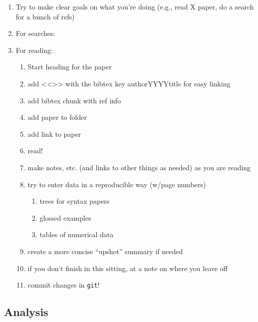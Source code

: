 \documentclass[11pt]{article}
\begin{document}
\begin{enumerate}
\item Try to make clear goals on what you're doing (e.g., read X paper, do a search for a bunch of refs)
\item For searches:
\item For reading:
\begin{enumerate}
\item Start heading for the paper
\item add <<>> with the bibtex key \label{authorYYYYtitle}authorYYYYtitle for easy linking
\item add bibtex chunk with ref info
\item add paper to folder
\item add link to paper
\item read!
\item make notes, etc. (and links to other things as needed) as you are reading
\item try to enter data in a reproducible way (w/page numbers)
\begin{enumerate}
\item trees for syntax papers
\item glossed examples
\item tables of numerical data
\end{enumerate}
\item create a more concise ``upshot'' summary if needed
\item if you don't finish in this sitting, at a note on where you leave off
\item commit changes in \texttt{git}!
\end{enumerate}
\end{enumerate}
\subsection{Analysis}
\label{sec-4-4}
\end{document}
